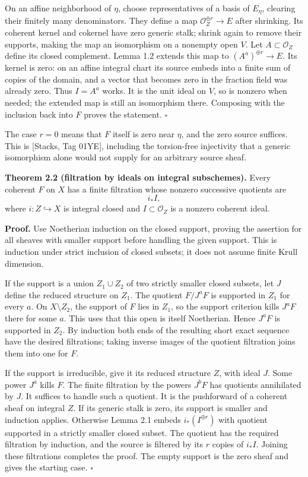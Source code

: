 \documentclass[11pt]{article}
\begin{document}
On an affine neighborhood of \(\eta\), choose representatives of a basis
of \(E_\eta\), clearing their finitely many denominators. They define a
map \(\mathcal O_Z^{\oplus r}\to E\) after shrinking. Its coherent
kernel and cokernel have zero generic stalk; shrink again to remove
their supports, making the map an isomorphism on a nonempty open \(V\).
Let \(A\subset\mathcal O_Z\) define its closed complement. Lemma 1.2
extends this map to \((A^a)^{\oplus r}\to E\). Its kernel is zero: on an
affine integral chart its source embeds into a finite sum of copies of
the domain, and a vector that becomes zero in the fraction field was
already zero. Thus \(I=A^a\) works. It is the unit ideal on \(V\), so is
nonzero when needed; the extended map is still an isomorphism there.
Composing with the inclusion back into \(F\) proves the statement.
\(\square\)

The case \(r=0\) means that \(F\) itself is zero near \(\eta\), and the
zero source suffices. This is {[}Stacks, Tag 01YE{]}, including the
torsion-free injectivity that a generic isomorphism alone would not
supply for an arbitrary source sheaf.

\textbf{Theorem 2.2 (filtration by ideals on integral subschemes).}
Every coherent \(F\) on \(X\) has a finite filtration whose nonzero
successive quotients are \[
i_*I,
\] where \(i:Z\hookrightarrow X\) is integral closed and
\(I\subset\mathcal O_Z\) is a nonzero coherent ideal.

\textbf{Proof.} Use Noetherian induction on the closed support, proving
the assertion for all sheaves with smaller support before handling the
given support. This is induction under strict inclusion of closed
subsets; it does not assume finite Krull dimension.

If the support is a union \(Z_1\cup Z_2\) of two strictly smaller closed
subsets, let \(J\) define the reduced structure on \(Z_1\). The quotient
\(F/J^aF\) is supported in \(Z_1\) for every \(a\). On
\(X\setminus Z_2\), the support of \(F\) lies in \(Z_1\), so the support
criterion kills \(J^aF\) there for some \(a\). This uses that this open
is itself Noetherian. Hence \(J^aF\) is supported in \(Z_2\). By
induction both ends of the resulting short exact sequence have the
desired filtrations; taking inverse images of the quotient filtration
joins them into one for \(F\).

If the support is irreducible, give it its reduced structure \(Z\), with
ideal \(J\). Some power \(J^a\) kills \(F\). The finite filtration by
the powers \(J^bF\) has quotients annihilated by \(J\). It suffices to
handle such a quotient. It is the pushforward of a coherent sheaf on
integral \(Z\). If its generic stalk is zero, its support is smaller and
induction applies. Otherwise Lemma 2.1 embeds \(i_*(I^{\oplus r})\) with
quotient supported in a strictly smaller closed subset. The quotient has
the required filtration by induction, and the source is filtered by its
\(r\) copies of \(i_*I\). Joining these filtrations completes the proof.
The empty support is the zero sheaf and gives the starting case.
\(\square\)
\end{document}
